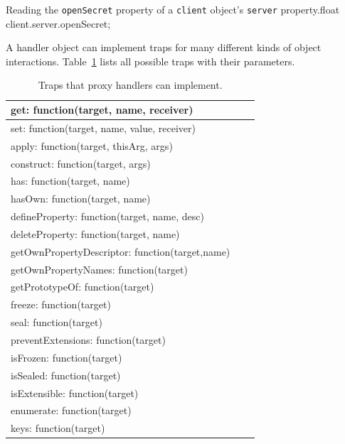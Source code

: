 \begin{code}{Reading the \lstinline{openSecret} property of a \lstinline{client} object's \lstinline{server} property.}{float}
client.server.openSecret;
\end{code}
\iffalse
\end{verbatim}\fi

A handler object can implement traps for many different kinds of object interactions.
Table~\ref{table:traps} lists all possible traps with their parameters.

\begin{table}[h]
\begin{center}
\begin{tabular}{|l|l|r|}
\hline
get: function(target, name, receiver) \\ \hline
set: function(target, name, value, receiver) \\ \hline
apply: function(target, thisArg, args) \\ \hline
construct: function(target, args) \\ \hline
has: function(target, name) \\ \hline
hasOwn: function(target, name) \\ \hline
defineProperty: function(target, name, desc) \\ \hline
deleteProperty: function(target, name) \\ \hline
getOwnPropertyDescriptor: function(target,name) \\ \hline
getOwnPropertyNames: function(target) \\ \hline
getPrototypeOf: function(target) \\ \hline
freeze: function(target) \\ \hline
seal: function(target) \\ \hline
preventExtensions: function(target) \\ \hline
isFrozen: function(target) \\ \hline
isSealed: function(target) \\ \hline
isExtensible: function(target) \\ \hline
enumerate: function(target) \\ \hline
keys: function(target) \\ \hline
\end{tabular}
\caption[Table caption text]{Traps that proxy handlers can implement.}
\label{table:traps}
\end{center}
\end{table}

